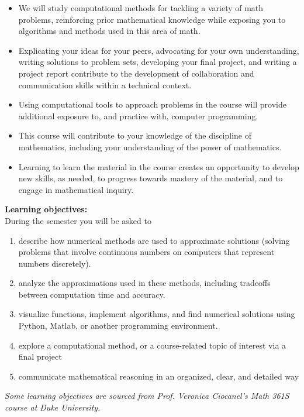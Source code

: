 \documentclass[12pt,letterpaper]{exam}
\begin{document}
\begin{itemize}
\setlength\itemsep{0.1em}
    \item We will study computational methods for tackling a variety of math problems, reinforcing prior mathematical knowledge while exposing you to algorithms and methods used in this area of math.
    \item Explicating your ideas for your peers, advocating for your own understanding, writing solutions to problem sets, developing your final project, and writing a project report contribute to the development of collaboration and communication skills within a technical context.
    \item Using computational tools to approach problems in the course will provide additional exposure to, and practice with, computer programming.
    \item This course will contribute to your knowledge of the discipline of mathematics, including your understanding of the power of mathematics.
    \item Learning to learn the material in the course creates an opportunity to develop new skills, as needed, to progress towards mastery of the material, and to engage in mathematical inquiry.
\end{itemize}
\textbf{Learning objectives:} \\
During the semester you will be asked to
\begin{enumerate}
\setlength\itemsep{0.1em}
\item describe how numerical methods are used to approximate solutions (solving problems that involve continuous numbers on computers that represent numbers discretely).
\item analyze the approximations used in these methods, including tradeoffs between computation time and accuracy.
\item visualize functions, implement algorithms, and find numerical solutions using Python, Matlab, or another programming environment.
\item explore a computational method, or a course-related topic of interest via a final project
\item communicate mathematical reasoning in an organized, clear, and detailed way
\end{enumerate}

\noindent \emph{Some learning objectives are sourced from Prof. Veronica Ciocanel's Math 361S course at Duke University.}
\end{document}

